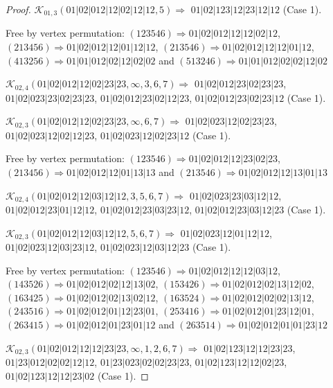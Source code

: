 \documentclass[12pt]{article}
\theoremstyle{plain}
\theoremstyle{definition}
\theoremstyle{remark}
\newcommand{\fancy}[1]{\mathcal{#1}}
\def\K{\fancy{K}}
\begin{document}
\begin{proof}
	$\K_{01,3}(01|02|012|12|02|12|12,5)\Rightarrow $ $01|02|123|12|23|12|12$ (Case 1).
	
	
	
	Free by vertex permutation: $(1 2 3 5 4 6)\Rightarrow 01|02|012|12|12|02|12$, $(2 1 3 4 5 6)\Rightarrow 01|02|012|12|01|12|12$, $(2 1 3 5 4 6)\Rightarrow 01|02|012|12|12|01|12$, $(4 1 3 2 5 6)\Rightarrow 01|01|012|02|12|02|02$ and $(5 1 3 2 4 6)\Rightarrow 01|01|012|02|02|12|02$
	
	
	
	\bigskip
	
	$\K_{02,4}(01|02|012|12|02|23|23,\infty,3, 6, 7)\Rightarrow $ $01|02|012|23|02|23|23$, $01|02|023|23|02|23|23$, $01|02|012|23|02|12|23$, $01|02|012|23|02|23|12$ (Case 1).
	
	$\K_{02,3}(01|02|012|12|02|23|23,\infty,6, 7)\Rightarrow $ $01|02|023|12|02|23|23$, $01|02|023|12|02|12|23$, $01|02|023|12|02|23|12$ (Case 1).
	
	
	
	Free by vertex permutation: $(1 2 3 5 4 6)\Rightarrow 01|02|012|12|23|02|23$, $(2 1 3 4 5 6)\Rightarrow 01|02|012|12|01|13|13$ and $(2 1 3 5 4 6)\Rightarrow 01|02|012|12|13|01|13$
	
	
	
	\bigskip
	
	$\K_{02,4}(01|02|012|12|03|12|12,3, 5, 6, 7)\Rightarrow $ $01|02|023|23|03|12|12$, $01|02|012|23|01|12|12$, $01|02|012|23|03|23|12$, $01|02|012|23|03|12|23$ (Case 1).
	
	$\K_{02,3}(01|02|012|12|03|12|12,5, 6, 7)\Rightarrow $ $01|02|023|12|01|12|12$, $01|02|023|12|03|23|12$, $01|02|023|12|03|12|23$ (Case 1).
	
	
	
	Free by vertex permutation: $(1 2 3 5 4 6)\Rightarrow 01|02|012|12|12|03|12$, $(1 4 3 5 2 6)\Rightarrow 01|02|012|02|12|13|02$, $(1 5 3 4 2 6)\Rightarrow 01|02|012|02|13|12|02$, $(1 6 3 4 2 5)\Rightarrow 01|02|012|02|13|02|12$, $(1 6 3 5 2 4)\Rightarrow 01|02|012|02|02|13|12$, $(2 4 3 5 1 6)\Rightarrow 01|02|012|01|12|23|01$, $(2 5 3 4 1 6)\Rightarrow 01|02|012|01|23|12|01$, $(2 6 3 4 1 5)\Rightarrow 01|02|012|01|23|01|12$ and $(2 6 3 5 1 4)\Rightarrow 01|02|012|01|01|23|12$
	
	
	
	\bigskip
	
	$\K_{02,3}(01|02|012|12|12|23|23,\infty,1, 2, 6, 7)\Rightarrow $ $01|02|123|12|12|23|23$, $01|23|012|02|02|12|12$, $01|23|023|02|02|23|23$, $01|02|123|12|12|02|23$, $01|02|123|12|12|23|02$ (Case 1).
	

\end{proof}
\end{document}
